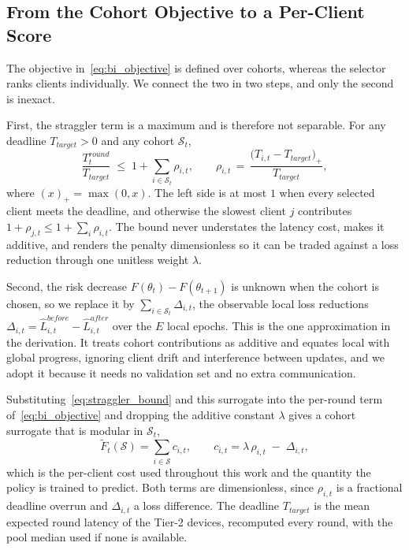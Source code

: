 \documentclass[journal]{IEEEtran}
\theoremstyle{remark}
\newcommand{\revtwo}[1]{#1}
\newcommand{\revtwoeq}{}
\begin{document}
\subsection{\revtwo{From the Cohort Objective to a Per-Client Score}}
\revtwo{The objective in~\eqref{eq:bi_objective} is defined over cohorts, whereas the selector ranks clients individually. We connect the two in two steps, and only the second is inexact.}

\revtwo{First, the straggler term is a maximum and is therefore not separable. For any deadline $T_{target}>0$ and any cohort $\mathcal{S}_t$,}
\begin{equation}
	\revtwoeq \frac{T_t^{round}}{T_{target}}\;\le\;1+\sum_{i\in\mathcal{S}_t}\rho_{i,t},\qquad
	\rho_{i,t}\,=\,\frac{\bigl(T_{i,t}-T_{target}\bigr)_{+}}{T_{target}},
	\label{eq:straggler_bound}
\end{equation}
\revtwo{where $(x)_+=\max(0,x)$. The left side is at most $1$ when every selected client meets the deadline, and otherwise the slowest client $j$ contributes $1+\rho_{j,t}\le 1+\sum_i\rho_{i,t}$. The bound never understates the latency cost, makes it additive, and renders the penalty dimensionless so it can be traded against a loss reduction through one unitless weight $\lambda$.}

\revtwo{Second, the risk decrease $F(\theta_t)-F(\theta_{t+1})$ is unknown when the cohort is chosen, so we replace it by $\sum_{i\in\mathcal{S}_t}\Delta_{i,t}$, the observable local loss reductions $\Delta_{i,t}=\hat{L}^{before}_{i,t}-\hat{L}^{after}_{i,t}$ over the $E$ local epochs. This is the one approximation in the derivation. It treats cohort contributions as additive and equates local with global progress, ignoring client drift and interference between updates, and we adopt it because it needs no validation set and no extra communication.}

\revtwo{Substituting~\eqref{eq:straggler_bound} and this surrogate into the per-round term of~\eqref{eq:bi_objective} and dropping the additive constant $\lambda$ gives a cohort surrogate that is modular in $\mathcal{S}_t$,}
\begin{equation}
	\revtwoeq \widetilde{F}_t(\mathcal{S})=\sum_{i\in\mathcal{S}}c_{i,t},\qquad
	c_{i,t}=\lambda\,\rho_{i,t}\;-\;\Delta_{i,t} ,
	\label{eq:cost}
\end{equation}
\revtwo{which is the per-client cost used throughout this work and the quantity the policy is trained to predict. Both terms are dimensionless, since $\rho_{i,t}$ is a fractional deadline overrun and $\Delta_{i,t}$ a loss difference. The deadline $T_{target}$ is the mean expected round latency of the Tier-2 devices, recomputed every round, with the pool median used if none is available.}
\end{document}
